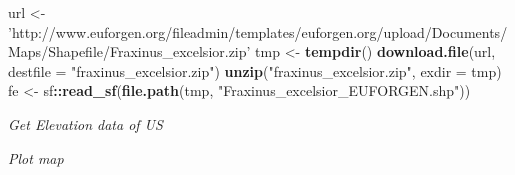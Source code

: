 \documentclass[author-year, review, 11pt]{components/elsarticle} %
\newenvironment{Shaded}{\begin{snugshade}}{\end{snugshade}}
\newcommand{\KeywordTok}[1]{\textcolor[rgb]{0.13,0.29,0.53}{\textbf{#1}}}
\newcommand{\DataTypeTok}[1]{\textcolor[rgb]{0.13,0.29,0.53}{#1}}
\newcommand{\StringTok}[1]{\textcolor[rgb]{0.31,0.60,0.02}{#1}}
\newcommand{\OperatorTok}[1]{\textcolor[rgb]{0.81,0.36,0.00}{\textbf{#1}}}
\newcommand{\NormalTok}[1]{#1}
\begin{document}
\begin{Shaded}
\begin{Highlighting}[]
\NormalTok{url <-}\StringTok{ 'http://www.euforgen.org/fileadmin/templates/euforgen.org/upload/Documents/Maps/Shapefile/Fraxinus_excelsior.zip'}
\NormalTok{tmp <-}\StringTok{ }\KeywordTok{tempdir}\NormalTok{()}
\KeywordTok{download.file}\NormalTok{(url, }\DataTypeTok{destfile =} \StringTok{"fraxinus_excelsior.zip"}\NormalTok{)}
\KeywordTok{unzip}\NormalTok{(}\StringTok{"fraxinus_excelsior.zip"}\NormalTok{, }\DataTypeTok{exdir =}\NormalTok{ tmp)}
\NormalTok{fe <-}\StringTok{ }\NormalTok{sf}\OperatorTok{::}\KeywordTok{read_sf}\NormalTok{(}\KeywordTok{file.path}\NormalTok{(tmp, }\StringTok{"Fraxinus_excelsior_EUFORGEN.shp"}\NormalTok{))}
\end{Highlighting}
\end{Shaded}

\emph{Get Elevation data of US}

\begin{Shaded}
\end{Shaded}

\emph{Plot map}
\end{document}
